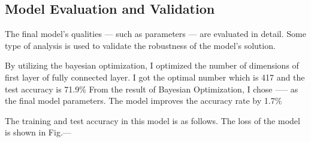 \subsection{Model Evaluation and Validation}
The final model’s qualities — such as parameters — are evaluated in detail. Some type of analysis is used to validate the robustness of the model’s solution.

By utilizing the bayesian optimization, I optimized the number of dimensions of first layer of fully connected layer. I got the optimal number which is 417 and the test accuracy is 71.9\%
From the result of Bayesian Optimization, I chose ----- as the final model parameters.
The model improves the accuracy rate by 1.7\%

The training and test accuracy in this model is as follows.
The loss of the model is shown in Fig.--- 


